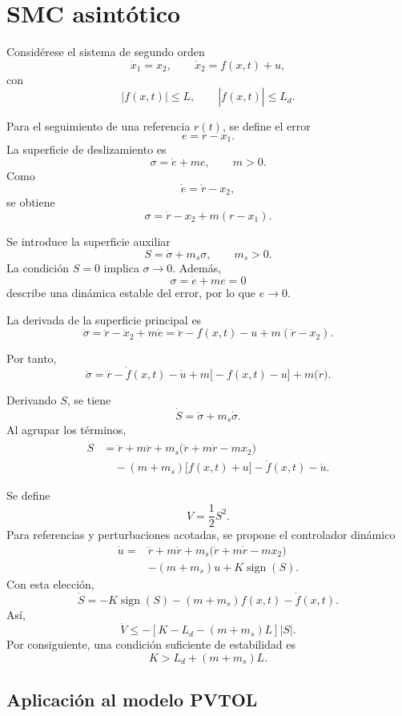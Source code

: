 \clearpage

\section{SMC asintótico}

Considérese el sistema de segundo orden
\[
  \dot x_1=x_2,\qquad
  \dot x_2=f(x,t)+u,
\]
con
\[
  |f(x,t)|\leq L,\qquad
  |\dot f(x,t)|\leq L_d.
\]

Para el seguimiento de una referencia \(r(t)\), se define el error
\[
  e=r-x_1.
\]
La superficie de deslizamiento es
\[
  \boxed{\sigma=\dot e+me},
  \qquad m>0.
\]
Como
\[
  \dot e=\dot r-x_2,
\]
se obtiene
\[
  \sigma=\dot r-x_2+m(r-x_1).
\]

Se introduce la superficie auxiliar
\[
  \boxed{S=\dot\sigma+m_s\sigma},
  \qquad m_s>0.
\]
La condición \(S=0\) implica \(\sigma\to0\). Además,
\[
  \sigma=\dot e+me=0
\]
describe una dinámica estable del error, por lo que \(e\to0\).

La derivada de la superficie principal es
\[
  \dot\sigma
  =\ddot r-\dot x_2+m\dot e
  =\ddot r-f(x,t)-u+m(\dot r-x_2).
\]

Por tanto,
\[
  \ddot\sigma
  =\dddot r-\dot f(x,t)-\dot u
  +m\bigl[-f(x,t)-u\bigr]
  +m\bigl(\ddot r\bigr).
\]

Derivando \(S\), se tiene
\[
  \dot S=\ddot\sigma+m_s\dot\sigma.
\]
Al agrupar los términos,
\begin{align*}
  \dot S
  &=
  \dddot r+m\ddot r
  +m_s\bigl(\ddot r+m\dot r-mx_2\bigr)\\
  &\quad
  -(m+m_s)\bigl[f(x,t)+u\bigr]
  -\dot f(x,t)-\dot u.
\end{align*}

Se define
\[
  V=\frac{1}{2}S^2.
\]
Para referencias y perturbaciones acotadas, se propone el controlador dinámico
\[
\begin{aligned}
  \dot u={}&
  \dddot r+m\ddot r
  +m_s\bigl(\ddot r+m\dot r-mx_2\bigr)\\
  &-(m+m_s)u
  +K\operatorname{sign}(S).
\end{aligned}
\]
Con esta elección,
\[
  \dot S
  =-K\operatorname{sign}(S)
  -(m+m_s)f(x,t)-\dot f(x,t).
\]
Así,
\[
  \dot V
  \leq
  -\left[K-L_d-(m+m_s)L\right]|S|.
\]
Por consiguiente, una condición suficiente de estabilidad es
\[
  \boxed{K>L_d+(m+m_s)L}.
\]

\subsection{Aplicación al modelo PVTOL}

